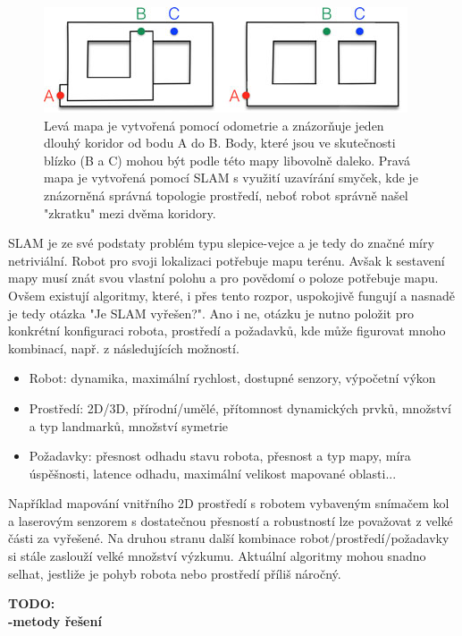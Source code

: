\documentclass[12pt,a4paper]{article}
\begin{document}
\begin{figure}[H]
\includegraphics[scale=1]{Obr1} 
\caption{Levá mapa je vytvořená pomocí odometrie a znázorňuje jeden dlouhý koridor od bodu A do B. Body, které jsou ve skutečnosti blízko (B a C) mohou být podle této mapy libovolně daleko. Pravá mapa je vytvořená pomocí SLAM s využití uzavírání smyček, kde je znázorněná správná topologie prostředí, neboť robot správně našel "zkratku" mezi dvěma koridory.}
\end{figure}


\newpage
SLAM je ze své podstaty problém typu slepice-vejce a je tedy do značné míry netriviální. Robot pro svoji lokalizaci potřebuje mapu terénu. Avšak k sestavení mapy musí znát svou vlastní polohu a pro povědomí o poloze potřebuje mapu. Ovšem existují algoritmy, které, i přes tento rozpor, uspokojivě fungují a nasnadě je tedy otázka "Je SLAM vyřešen?". Ano i ne, otázku je nutno položit pro konkrétní konfiguraci robota, prostředí a požadavků, kde může figurovat mnoho kombinací, např. z následujících možností.
\begin{itemize}
\item Robot: dynamika, maximální rychlost, dostupné senzory, výpočetní výkon
\item Prostředí: 2D/3D, přírodní/umělé, přítomnost dynamických prvků, množství a typ landmarků, množství symetrie
\item Požadavky: přesnost odhadu stavu robota, přesnost a typ mapy, míra úspěšnosti, latence odhadu, maximální velikost mapované oblasti...
\end{itemize}
Například mapování vnitřního 2D prostředí s robotem vybaveným snímačem kol a laserovým senzorem s dostatečnou přesností a robustností lze považovat z velké části za vyřešené. Na druhou stranu další kombinace robot/prostředí/požadavky si stále zaslouží velké množství výzkumu. Aktuální algoritmy mohou snadno selhat, jestliže je pohyb robota nebo prostředí příliš náročný.


\textbf{TODO: \\
-metody řešení} 
\end{document}
